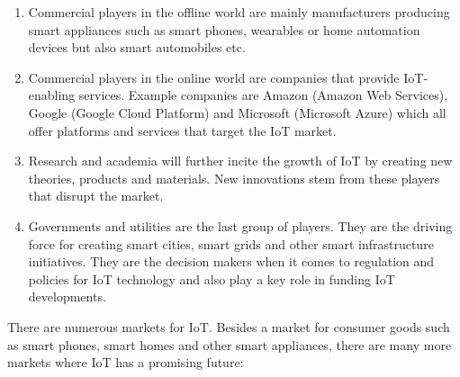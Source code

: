 			\begin{enumerate}

				\item Commercial players in the offline world are mainly manufacturers producing smart appliances such as smart phones, wearables or home automation devices but also smart automobiles etc.

				\item Commercial players in the online world are companies that provide IoT-enabling services. Example companies are Amazon (Amazon Web Services), Google (Google Cloud Platform) and Microsoft (Microsoft Azure) which all offer platforms and services that target the IoT market.

				\item Research and academia will further incite the growth of IoT by creating new theories, products and materials. New innovations stem from these players that disrupt the market.

				\item Governments and utilities are the last group of players. They are the driving force for creating smart cities, smart grids and other smart infrastructure initiatives. They are the decision makers when it comes to regulation and policies for IoT technology and also play a key role in funding IoT developments.

			\end{enumerate}
			
			 			
			There are numerous markets for IoT. Besides a market for consumer goods such as smart phones, smart homes and other smart appliances, there are many more markets where IoT has a promising future:

